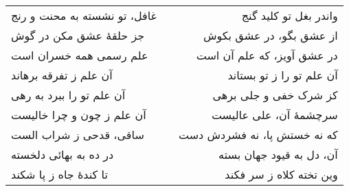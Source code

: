 \begin{center}
\begin{longtable}{l p{0.5cm} r}
\\
غافل، تو نشسته به محنت و رنج
&&
واندر بغل تو کلید گنج
\\
جز حلقهٔ عشق مکن در گوش
&&
از عشق بگو، در عشق بکوش
\\
علم رسمی همه خسران است
&&
در عشق آویز، که علم آن است
\\
آن علم ز تفرقه برهاند
&&
آن علم تو را ز تو بستاند
\\
آن علم تو را ببرد به رهی
&&
کز شرک خفی و جلی برهی
\\
آن علم ز چون و چرا خالیست
&&
سرچشمهٔ آن، علی عالیست
\\
ساقی، قدحی ز شراب الست
&&
که نه خستش پا، نه فشردش دست
\\
در ده به بهائی دلخسته
&&
آن، دل به قیود جهان بسته
\\
تا کندهٔ جاه ز پا شکند
&&
وین تخته کلاه ز سر فکند
\\
\end{longtable}
\end{center}
